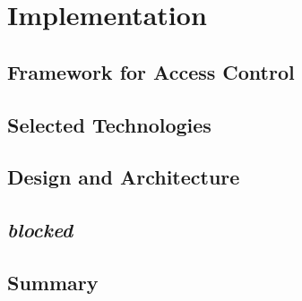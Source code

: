 \chapter{Implementation}
\label{chap:implementation}

\section{Framework for Access Control}

\section{Selected Technologies}


\section{Design and Architecture}

\section{\textit{blocked}}

\section{Summary}


